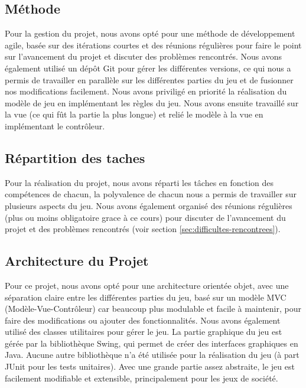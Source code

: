 \documentclass{article}
\begin{document}
    \subsection{Méthode}\label{subsec:methode}

    Pour la gestion du projet, nous avons opté pour une méthode de développement agile, basée sur des itérations courtes et des réunions régulières pour faire le point sur l'avancement du projet et discuter des problèmes rencontrés.
    Nous avons également utilisé un dépôt Git pour gérer les différentes versions, ce qui nous a permis de travailler en parallèle sur les différentes parties du jeu et de fusionner nos modifications facilement.
    Nous avons priviligé en priorité la réalisation du modèle de jeu en implémentant les règles du jeu.
    Nous avons ensuite travaillé sur la vue (ce qui fût la partie la plus longue) et relié le modèle à la vue en implémentant le contrôleur.

    \subsection{Répartition des taches}\label{subsec:repartition-des-taches}
    Pour la réalisation du projet, nous avons réparti les tâches en fonction des compétences de chacun, la polyvalence de chacun nous a permis de travailler sur plusieurs aspects du jeu.
    Nous avons également organisé des réunions régulières (plus ou moins obligatoire grace à ce cours) pour discuter de l'avancement du projet et des problèmes rencontrés (voir section \ref{sec:difficultes-rencontrees}).

    \subsection{Architecture du Projet}\label{subsec:architecture-du-projet}
    Pour ce projet, nous avons opté pour une architecture orientée objet, avec une séparation claire entre les différentes parties du jeu, basé sur un modèle MVC (Modèle-Vue-Contrôleur) car beaucoup plus modulable et facile à maintenir, pour faire des modifications ou ajouter des fonctionnalités.
    Nous avons également utilisé des classes utilitaires pour gérer le jeu.
    La partie graphique du jeu est gérée par la bibliothèque Swing, qui permet de créer des interfaces graphiques en Java.
    Aucune autre bibliothèque n'a été utilisée pour la réalisation du jeu (à part JUnit pour les tests unitaires).
    Avec une grande partie assez abstraite, le jeu est facilement modifiable et extensible, principalement pour les jeux de société.
\end{document}

